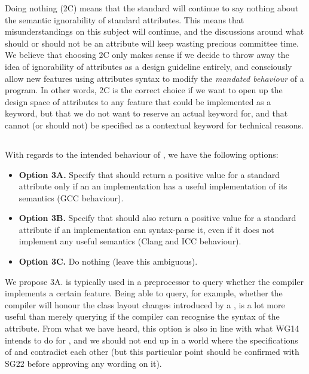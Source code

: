 Doing nothing (2C) means that the standard will continue to say nothing about the semantic ignorability of standard attributes. This means that misunderstandings on this subject will continue, and the discussions around what should or should not be an attribute will keep wasting precious committee time. We believe that choosing 2C only makes sense if we decide to throw away the idea of ignorability of attributes as a design guideline entirely, and consciously allow new features using attributes syntax to modify the \emph{mandated behaviour} of a program. In other words, 2C is the correct choice if we want to open up the design space of attributes to any feature that could be implemented as a keyword, but that we do not want to reserve an actual keyword for, and that cannot (or should not) be specified as a contextual keyword for technical reasons.

\subsection{}

With regards to the intended behaviour of , we have the following options:

\begin{itemize}
\item \textbf{Option 3A.} Specify that  should return a positive value for a standard attribute only if an an implementation has a useful implementation of its semantics (GCC behaviour).
\item \textbf{Option 3B.} Specify that  should also return a positive value for a standard attribute if an implementation can syntax-parse it, even if it does not implement any useful semantics (Clang and ICC behaviour).
\item \textbf{Option 3C.} Do nothing (leave this ambiguous).
\end{itemize}

We propose 3A.  is typically used in a preprocessor  to query whether the compiler implements a certain feature. Being able to query, for example, whether the compiler will honour the class layout changes introduced by a , is a lot more useful than merely querying if the compiler can recognise the syntax of the attribute. From what we have heard, this option is also in line with what WG14 intends to do for , and we should not end up in a world where the specifications of  and  contradict each other (but this particular point should  be confirmed with SG22 before approving any wording on it).

